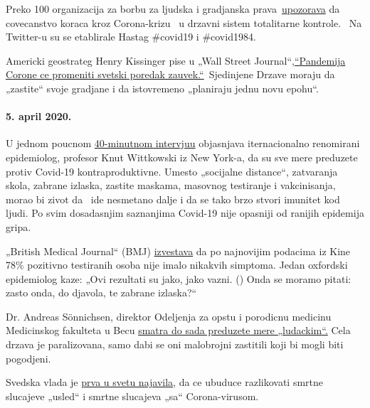 Preko 100 organizacija za borbu za ljudska i gradjanska
prava~\href{https://www.dailymail.co.uk/news/article-8181381/World-sleepwalking-surveillance-state-rights-groups-warn.html}{upozorava}
da covecanstvo koraca kroz Corona-krizu ~u drzavni sistem totalitarne
kontrole.~ Na Twitter-u su se etablirale Hastag \#covid19 i \#covid1984.

Americki geostrateg Henry Kissinger pise u „Wall Street
Journal``,\href{https://www.wsj.com/articles/the-coronavirus-pandemic-will-forever-alter-the-world-order-11585953005}{``Pandemija
Corone ce promeniti svetski poredak zauvek.``}~Sjedinjene Drzave moraju
da „zastite`` svoje gradjane i da istovremeno „planiraju jednu novu
epohu``.

\hypertarget{5-april-2020}{%
\paragraph{5. april 2020.}\label{5-april-2020}}

U jednom poucnom
\href{https://www.youtube.com/watch?v=lGC5sGdz4kg}{40-minutnom
intervjuu} objasnjava iternacionalno renomirani epidemiolog, profesor
Knut Wittkowski iz New York-a, da su sve mere preduzete protiv Covid-19
kontraproduktivne. Umesto „socijalne distance``, zatvaranja skola,
zabrane izlaska, zastite maskama, masovnog testiranje i vakcinisanja,
morao bi zivot da~ ide nesmetano dalje i da se tako brzo stvori imunitet
kod ljudi. Po svim dosadasnjim saznanjima Covid-19 nije opasniji od
ranijih epidemija gripa.

„British Medical Journal`` (BMJ)
\href{https://www.bmj.com/content/369/bmj.m1375}{izvestava} da po
najnovijim podacima iz Kine 78\% pozitivno testiranih osoba nije imalo
nikakvih simptoma. Jedan oxfordski epidemiolog kaze: „Ovi rezultati su
jako, jako vazni. () Onda se moramo pitati: zasto onda, do djavola, te
zabrane izlaska?``

Dr. Andreas Sönnichsen, direktor Odeljenja za opstu i porodicnu medicinu
Medicinskog fakulteta u Becu
\href{https://www.diepresse.com/5794224/was-machen-wir-da-auf-den-intensivstationen-eigentlich}{smatra
do sada preduzete mere „ludackim``.} Cela drzava je paralizovana, samo
dabi se oni malobrojni zastitili koji bi mogli biti pogodjeni.

Svedska vlada je
\href{https://www.telegraph.co.uk/news/2020/04/03/coronavirus-swedish-experiment-could-prove-britain-wrong/}{prva
u svetu najavila}, da ce ubuduce razlikovati smrtne slucajeve „usled`` i
smrtne slucajeva „sa`` Corona-virusom.

